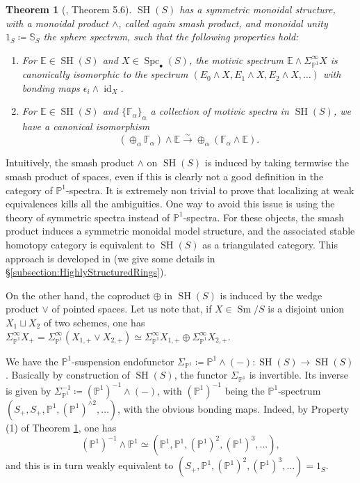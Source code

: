 \documentclass[10pt]{amsart}
\theoremstyle{definition}
\theoremstyle{plain}
\newtheorem{thm}[defn]{Theorem}
\numberwithin{equation}{section}
\newcommand{\0}{\emptyset}
\newcommand{\E}{{\mathbb E}}
\newcommand{\F}{{\mathbb F}}
\renewcommand{\P}{{\mathbb P}}
\newcommand{\SH}{{\operatorname{SH}}}
\newcommand{\Spc}{{\operatorname{Spc}}}
\newcommand{\Sm}{{\operatorname{Sm}}}
\newcommand{\id}{{\operatorname{id}}}
\begin{document}
\begin{thm}[\cite{voe:homotopy_theory}, Theorem 5.6]
\label{thm:SHsymmonoidal}
    $\SH(S)$ has a symmetric monoidal structure, with a monoidal product $\wedge$, called again \emph{smash product}, and monoidal unity $1_S \coloneqq \mathbb{S}_S$ the sphere spectrum, such that the following properties hold:
    \begin{enumerate}
        \item For $\E \in \SH(S)$ and $X \in \Spc_{\bullet}(S)$, the motivic spectrum $\E \wedge \Sigma_{\P^1}^\infty X$ is canonically isomorphic to the spectrum $(E_0 \wedge X, E_1 \wedge X, E_2 \wedge X, \ldots)$ with bonding maps $\epsilon_i \wedge \id_X$.
        \item For $\E \in \SH(S)$ and $\{\F_\alpha\}_\alpha$ a collection of motivic spectra in $\SH(S)$, we have a canonical isomorphism
        $$(\oplus_\alpha \F_\alpha) \wedge \E \xrightarrow{\sim} \oplus_\alpha(\F_\alpha \wedge \E).$$
    \end{enumerate}
\end{thm}

Intuitively, the smash product $\wedge$ on $\SH(S)$ is induced by taking termwise the smash product of spaces, even if this is clearly not a good definition in the category of $\P^1$-spectra. It is extremely non trivial to prove that localizing at weak equivalences kills all the ambiguities. One way to avoid this issue is using the theory of symmetric spectra instead of $\P^1$-spectra. For these objects, the smash product induces a symmetric monoidal model structure, and the associated stable homotopy category is equivalent to $\SH(S)$ as a triangulated category. This approach is developed in \cite{Jardine:SymSpectra} (we give some details in \S \ref{subsection:HighlyStructuredRings}).

On the other hand, the coproduct $\oplus$ in $\SH(S)$ is induced by the wedge product $\vee$ of pointed spaces. Let us note that, if $X \in \Sm/S$ is a disjoint union $X_1 \sqcup X_2$ of two schemes, one has $\Sigma^\infty_{\P^1}X_+ = \Sigma^\infty_{\P^1}(X_{1,+}\vee X_{2,+}) \simeq \Sigma_{\P^1}^\infty X_{1,+}\oplus \Sigma_{\P^1}^\infty X_{2,+}$.

We have the $\P^1$-suspension endofunctor $\Sigma_{\P^1}\coloneqq \P^1 \wedge (-):\SH(S) \to \SH(S)$. Basically by construction of $\SH(S)$, the functor $\Sigma_{\P^1}$ is invertible. Its inverse is given by $\Sigma_{\P^1}^{-1}\coloneqq (\P^1)^{-1}\wedge (-)$, with $(\P^1)^{-1}$ being the $\P^1$-spectrum $(S_+,S_+,\P^1,(\P^1)^{\wedge 2}, \ldots)$, with the obvious bonding maps. Indeed, by Property (1) of Theorem \ref{thm:SHsymmonoidal}, one has 
$$(\P^1)^{-1} \wedge \P^1 \simeq (\P^1,\P^1,(\P^1)^2, (\P^1)^3, \ldots),$$ and this is in turn weakly equivalent to $(S_+,\P^1,(\P^1)^2,(\P^1)^3, \ldots)=1_S$.
\end{document}
